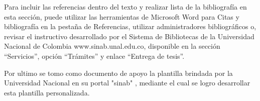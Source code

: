 Para incluir las referencias dentro del texto y realizar lista de la bibliografía en esta sección, puede utilizar las herramientas de Microsoft Word para Citas y bibliografía en la pestaña de Referencias, utilizar administradores bibliográficos o, revisar el instructivo desarrollado por el Sistema de Bibliotecas de la Universidad Nacional de Colombia www.sinab.unal.edu.co, disponible en la sección “Servicios”, opción “Trámites” y enlace “Entrega de tesis”.

Por ultimo se tomo como documento de apoyo la plantilla brindada por la Universidad Nacional en su portal "sinab" \cite{sinab}, mediante el cual se logro desarrollar esta plantilla personalizada.
